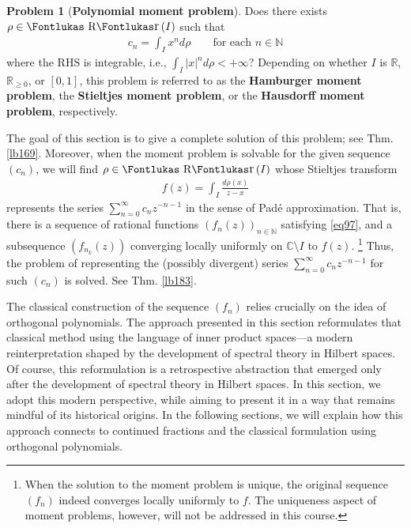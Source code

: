 \documentclass[12pt,b5paper,notitlepage]{article}
\theoremstyle{definition}
\newtheorem{problem}[df]{Problem}
\theoremstyle{plain}
\DeclareMathOperator{\Rr}{\text{\Fontlukas R}\text{\kern -0pt {\Fontlukas\large r}}\,}
\newcommand{\Cbb}{\mathbb C}
\newcommand{\Nbb}{\mathbb N}
\newcommand{\Rbb}{\mathbb R}
\numberwithin{equation}{section}
\begin{document}
\begin{problem}[\textbf{Polynomial moment problem}] \label{lb162}
Does there exists $\rho\in\Rr(I)$ such that
\begin{align}\label{eq79}
c_n=\int_I x^nd\rho\qquad\text{for each $n\in\Nbb$}
\end{align}
where the RHS is integrable, i.e., $\int_I |x|^nd\rho<+\infty$? Depending on whether $I$ is $\Rbb$, $\Rbb_{\geq0}$, or $[0,1]$, this problem is referred to as the \textbf{Hamburger moment problem},  the \textbf{Stieltjes moment problem},  or the \textbf{Hausdorff moment problem},  respectively.
\end{problem}

The goal of this section is to give a complete solution of this problem; see Thm. \ref{lb169}. Moreover, when the moment problem is solvable for the given sequence $(c_n)$, we will find $\rho\in\Rr(I)$ whose Stieltjes transform
\begin{align*}
f(z)=\int_I\frac{d\rho(x)}{z-x}
\end{align*}
represents the series $\sum_{n=0}^\infty c_nz^{-n-1}$ in the sense of Pad\'e approximation. That is, there is a sequence of rational functions $(f_n(z))_{n\in\Nbb}$ satisfying \eqref{eq97}, and a subsequence $(f_{n_k}(z))$ converging locally uniformly on $\Cbb\setminus I$ to $f(z)$. \footnote{When the solution to the moment problem is unique, the original sequence $(f_n)$ indeed converges locally uniformly to $f$. The uniqueness aspect of moment problems, however, will not be addressed in this course.} Thus, the problem of representing the (possibly divergent) series $\sum_{n=0}^\infty c_nz^{-n-1}$ for such $(c_n)$ is solved. See Thm. \ref{lb183}.



The classical construction of the sequence $(f_n)$ relies crucially on the idea of orthogonal polynomials. The approach presented in this section reformulates that classical method using the language of inner product spaces---a modern reinterpretation shaped by the development of spectral theory in Hilbert spaces. Of course, this reformulation is a retrospective abstraction that emerged only after the development of spectral theory in Hilbert spaces. In this section, we adopt this modern perspective, while aiming to present it in a way that remains mindful of its historical origins. In the following sections, we will explain how this approach connects to continued fractions and the classical formulation using orthogonal polynomials.
\end{document}
